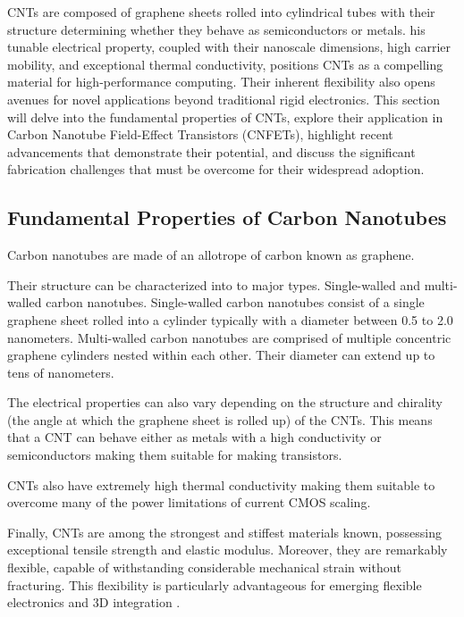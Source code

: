 \documentclass[sigconf]{acmart}
\begin{document}
CNTs are composed of graphene sheets rolled into cylindrical tubes
with their structure determining whether they behave as
semiconductors or metals. his tunable electrical property,
coupled with their nanoscale dimensions, 
high carrier mobility, and exceptional thermal conductivity, 
positions CNTs as a compelling material for high-performance 
computing. Their inherent flexibility also opens avenues for 
novel applications beyond traditional rigid electronics. 
This section will delve into the fundamental properties of 
CNTs, explore their application in Carbon Nanotube Field-Effect 
Transistors (CNFETs), highlight recent advancements that 
demonstrate their potential, and discuss the significant 
fabrication challenges that must be overcome for their widespread 
adoption.

\subsection{Fundamental Properties of Carbon Nanotubes}
Carbon nanotubes are made of an allotrope of carbon known as 
graphene.

Their structure can be characterized into to major types.
Single-walled and multi-walled carbon nanotubes. Single-walled 
carbon nanotubes consist of a single graphene sheet rolled into 
a cylinder typically with a diameter between 0.5 to 2.0 
nanometers. Multi-walled carbon nanotubes are comprised of 
multiple concentric graphene cylinders nested within each other. 
Their diameter can extend up to tens of nanometers. 

The electrical properties can also vary depending on the structure 
and chirality (the angle at which the graphene sheet
is rolled up) of the CNTs. This means that a CNT can behave either 
as metals with a high conductivity or semiconductors making them 
suitable for making transistors. 

CNTs also have extremely high thermal conductivity making them
suitable to overcome many of the power limitations of current 
CMOS scaling.

Finally, CNTs are among the strongest and stiffest materials 
known, possessing exceptional tensile strength and elastic 
modulus. Moreover, they are remarkably flexible, capable of 
withstanding considerable mechanical strain without fracturing. 
This flexibility is particularly advantageous for emerging 
flexible electronics and 3D integration \cite{appenzeller2008carbon}. 
\end{document}
